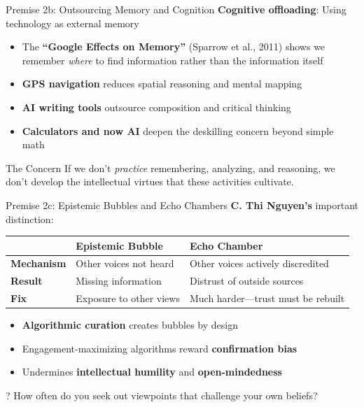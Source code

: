\documentclass[aspectratio=169]{beamer}
\begin{document}
\begin{frame}{Premise 2b: Outsourcing Memory and Cognition}
\textbf{Cognitive offloading}: Using technology as external memory

\begin{itemize}
    \item The \textbf{``Google Effects on Memory''} (Sparrow et al., 2011) shows we remember \textit{where} to find information rather than the information itself
    \item \textbf{GPS navigation} reduces spatial reasoning and mental mapping
    \item \textbf{AI writing tools} outsource composition and critical thinking
    \item \textbf{Calculators and now AI} deepen the deskilling concern beyond simple math
\end{itemize}

\vspace{0.3cm}
\begin{alertblock}{The Concern}
If we don't \textit{practice} remembering, analyzing, and reasoning, we don't develop the intellectual virtues that these activities cultivate.
\end{alertblock}
\end{frame}

\begin{frame}{Premise 2c: Epistemic Bubbles and Echo Chambers}
\textbf{C. Thi Nguyen's} important distinction:

\begin{table}[h]
\centering
\small
\begin{tabular}{>{\bfseries}l p{4.5cm} p{4.5cm}}
\toprule
& \textbf{Epistemic Bubble} & \textbf{Echo Chamber} \\
\midrule
Mechanism & Other voices not heard & Other voices actively discredited \\
Result & Missing information & Distrust of outside sources \\
Fix & Exposure to other views & Much harder---trust must be rebuilt \\
\bottomrule
\end{tabular}
\end{table}

\vspace{0.2cm}
\begin{itemize}
    \item \textbf{Algorithmic curation} creates bubbles by design
    \item Engagement-maximizing algorithms reward \textbf{confirmation bias}
    \item Undermines \textbf{intellectual humility} and \textbf{open-mindedness}
\end{itemize}

\begin{alertblock}{?}
How often do you seek out viewpoints that challenge your own beliefs?
\end{alertblock}
\end{frame}
\end{document}
